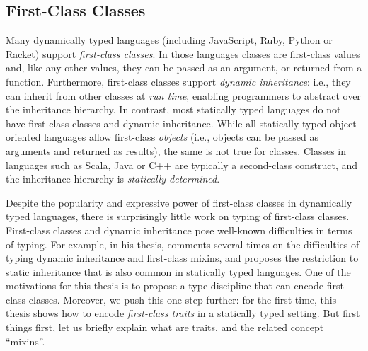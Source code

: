 \subsection{First-Class Classes}

Many dynamically typed languages (including JavaScript, Ruby, Python or Racket)
support \emph{first-class classes}. In those languages classes are first-class
values and, like any other values, they can be passed as an argument, or
returned from a function. Furthermore, first-class classes support \emph{dynamic inheritance}:
i.e., they can inherit from other classes at \emph{run time},
enabling programmers to abstract over the inheritance hierarchy. %
In contrast, most statically typed languages do not have first-class classes and
dynamic inheritance. While all statically typed object-oriented languages allow first-class
\emph{objects} (i.e., objects can be passed as arguments and returned as
results), the same is not true for classes. Classes in languages such as Scala,
Java or C++ are typically a second-class construct, and the inheritance
hierarchy is \emph{statically determined}.

Despite the popularity and expressive power of first-class classes in
dynamically typed languages, there is surprisingly little work on typing of
first-class classes. First-class classes and dynamic inheritance pose well-known
difficulties in terms of typing. For example, in his thesis,
\citet{bracha1992programming} comments several times on the difficulties of
typing dynamic inheritance and first-class mixins, and proposes the restriction
to static inheritance that is also common in statically typed languages. One of
the motivations for this thesis is to propose a type discipline that can encode
first-class classes. Moreover, we push this one step further: for the first
time, this thesis shows how to encode \emph{first-class traits} in a
statically typed setting. But first things first, let us briefly explain what are
traits, and the related concept ``mixins''.


